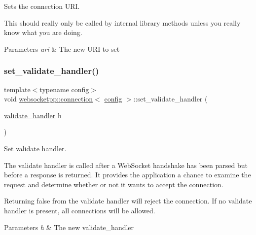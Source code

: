 Sets the connection U\+RI. 

This should really only be called by internal library methods unless you really know what you are doing.


\begin{DoxyParams}{Parameters}
{\em uri} & The new U\+RI to set \\
\hline
\end{DoxyParams}
\mbox{\label{classwebsocketpp_1_1connection_aa28096d051f5639d7b01954845fc054c}} 
\subsubsection{\texorpdfstring{set\+\_\+validate\+\_\+handler()}{set\_validate\_handler()}}
{\footnotesize\ttfamily template$<$typename config$>$ \\
void \mbox{\hyperlink{classwebsocketpp_1_1connection}{websocketpp\+::connection}}$<$ \mbox{\hyperlink{classconfig}{config}} $>$\+::set\+\_\+validate\+\_\+handler (\begin{DoxyParamCaption}\item[{\mbox{\hyperlink{namespacewebsocketpp_ae28f3fed86a59b1998746694f3d4edbd}{validate\+\_\+handler}}}]{h }\end{DoxyParamCaption})\hspace{0.3cm}{\ttfamily [inline]}}



Set validate handler. 

The validate handler is called after a Web\+Socket handshake has been parsed but before a response is returned. It provides the application a chance to examine the request and determine whether or not it wants to accept the connection.

Returning false from the validate handler will reject the connection. If no validate handler is present, all connections will be allowed.


\begin{DoxyParams}{Parameters}
{\em h} & The new validate\+\_\+handler \\
\hline
\end{DoxyParams}
\mbox{\label{classwebsocketpp_1_1connection_a8d26a29e90d4847f3882c280112c6b60}} 
